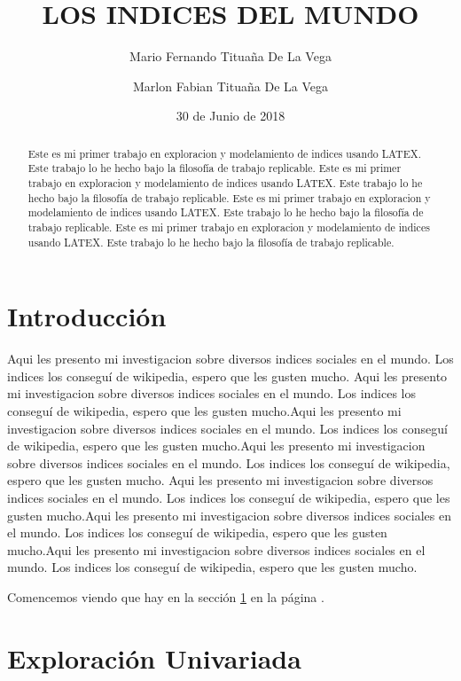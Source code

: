 \documentclass{article}
\title{LOS INDICES DEL MUNDO}
\author[1]{\normalsize Mario Fernando Titua\~na De La Vega}
\author[2]{\normalsize Marlon Fabian Titua\~na De La Vega}
\affil[1,2]{\small  Escuela de Ingeniería,Universidad de los Andes\\
\texttt{{delcurso,deallado}@uniandes.edu.col}}
\affil[1]{\small Instituto de altas investigaciones financieras\\
Banco del Parque\\
\texttt{delcurso@bp.com.col}}
\date{30 de Junio de 2018}
\begin{document}


\maketitle


\begin{abstract}
Este es mi primer trabajo en exploracion y modelamiento de indices usando LATEX. Este trabajo lo he hecho bajo la filosofía de trabajo replicable. Este es mi primer trabajo en exploracion y modelamiento de indices usando LATEX. Este trabajo lo he hecho bajo la filosofía de trabajo replicable. Este es mi primer trabajo en exploracion y modelamiento de indices usando LATEX. Este trabajo lo he hecho bajo la filosofía de trabajo replicable. Este es mi primer trabajo en exploracion y modelamiento de indices usando LATEX. Este trabajo lo he hecho bajo la filosofía de trabajo replicable.
\end{abstract}

\section*{Introducción}

Aqui les presento mi investigacion sobre diversos indices sociales en el mundo. Los indices los conseguí de wikipedia, espero que les gusten mucho. Aqui les presento mi investigacion sobre diversos indices sociales en el mundo. Los indices los conseguí de wikipedia, espero que les gusten mucho.Aqui les presento mi investigacion sobre diversos indices sociales en el mundo. Los indices los conseguí de wikipedia, espero que les gusten mucho.Aqui les presento mi investigacion sobre diversos indices sociales en el mundo. Los indices los conseguí de wikipedia, espero que les gusten mucho.
Aqui les presento mi investigacion sobre diversos indices sociales en el mundo. Los indices los conseguí de wikipedia, espero que les gusten mucho.Aqui les presento mi investigacion sobre diversos indices sociales en el mundo. Los indices los conseguí de wikipedia, espero que les gusten mucho.Aqui les presento mi investigacion sobre diversos indices sociales en el mundo. Los indices los conseguí de wikipedia, espero que les gusten mucho.

Comencemos viendo que hay en la sección \ref{univariada} en la página \pageref{univariada}.

\clearpage



\section{Exploración Univariada}\label{univariada}
\end{document}
